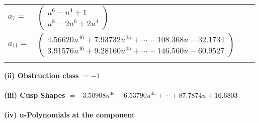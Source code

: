 \documentclass[1p]{elsarticle_modified}
\theoremstyle{definition}
\begin{document}
\begin{tabular}{m{7pt} m{180pt} m{7pt} m{180pt} }
\flushright $a_{7}=$&$\begin{pmatrix}u^6- u^4+1\\u^8-2 u^6+2 u^4\end{pmatrix}$ \\
\flushright $a_{11}=$&$\begin{pmatrix}4.56620 u^{46}+7.93732 u^{45}+\cdots-108.368 u-32.1734\\3.91576 u^{46}+9.28160 u^{45}+\cdots-146.560 u-60.9527\end{pmatrix}$\\&\end{tabular}
\flushleft \textbf{(ii) Obstruction class $= -1$}\\~\\
\flushleft \textbf{(iii) Cusp Shapes $= -3.50908 u^{46}-6.53790 u^{45}+\cdots+87.7874 u+16.6803$}\\~\\
\newpage\renewcommand{\arraystretch}{1}
\flushleft \textbf{(iv) u-Polynomials at the component}\newline \\
\end{document}
